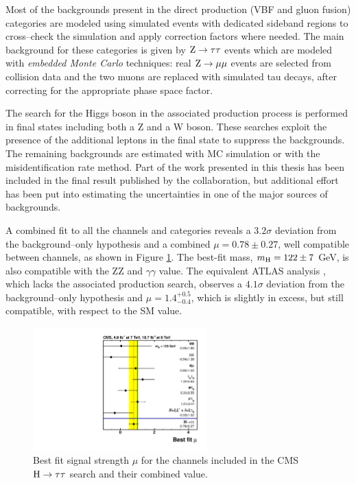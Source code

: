 Most of the backgrounds present in the direct production (VBF and gluon fusion) categories are modeled using simulated events with dedicated sideband regions to cross--check the simulation and apply correction factors where needed. The main background for these categories is given by $\mathrm{Z} \rightarrow \tau\tau$ events which are modeled with \emph{embedded Monte Carlo} techniques: real $\mathrm{Z} \rightarrow \mu \mu$ events are selected from collision data and the two muons are replaced with simulated tau decays, after correcting for the appropriate phase space factor.

The search for the Higgs boson in the associated production process is performed in final states including both a Z and a W boson. These searches exploit the presence of the additional leptons in the final state to suppress the backgrounds. The remaining backgrounds are estimated with MC simulation or with the misidentification rate method. Part of the work presented in this thesis has been included in the final result published by the collaboration, but additional effort has been put into estimating the uncertainties in one of the major sources of backgrounds. 

A combined fit to all the channels and categories reveals a $3.2\sigma$ deviation from the background--only hypothesis and a combined $\mu = 0.78 \pm 0.27$, well compatible between channels, as shown in Figure \ref{fig:htt_mu}. The best-fit mass, $m_{\mathrm{H}} = 122 \pm 7$ GeV, is also compatible with the ZZ and $\gamma\gamma$ value. The equivalent ATLAS analysis \cite{ATLASCONF:2013108}, which lacks the associated production search, observes a $4.1\sigma$ deviation from the background--only hypothesis and $\mu = 1.4^{+0.5}_{-0.4}$, which is slightly in excess, but still compatible, with respect to the SM value.

\begin{figure}
        \centering
	\includegraphics[width=0.6\textwidth]{1_Introduction_Th_and_Exp/pics/BestFit_sm_per_chn.pdf}
       \caption{Best fit signal strength $\mu$ for the channels included in the CMS $\mathrm{H} \rightarrow \tau \tau$ search and their combined value.}
       \label{fig:htt_mu}
\end{figure}


